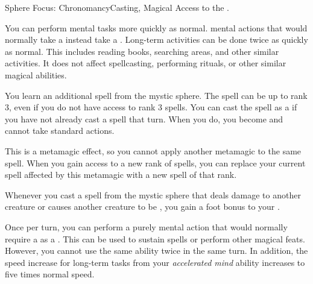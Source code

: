   \begin{magicalfeat}{Sphere Focus: Chronomancy}{Casting, Magical}
    \featpre Access to the  .

     You can perform mental tasks more quickly as normal.
     mental actions that would normally take a  instead take a .
    Long-term activities can be done twice as quickly as normal.
    This includes reading books, searching areas, and other similar activities.
    It does not affect spellcasting, performing rituals, or other similar magical abilities.

     You learn an additional spell from the  mystic sphere.
    The spell can be up to rank 3, even if you do not have access to rank 3 spells.
    You can cast the spell as a  if you have not already cast a spell that turn.
    When you do, you \briefly become \slowed and cannot take standard actions.

    This is a metamagic effect, so you cannot apply another metamagic to the same spell.
    When you gain access to a new rank of spells, you can replace your current spell affected by this metamagic with a new spell of that rank.

     Whenever you cast a spell from the  mystic sphere that deals damage to another creature or causes another creature to be \slowed, you \briefly gain a  foot bonus to your .

     Once per turn, you can perform a purely mental action that would normally require a  as a .
    This can be used to sustain spells or perform other magical feats.
    However, you cannot use the same ability twice in the same turn.
    In addition, the speed increase for long-term tasks from your \textit{accelerated mind} ability increases to five times normal speed.
  \end{magicalfeat}

